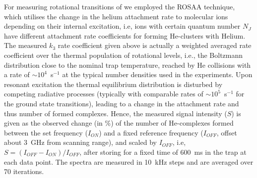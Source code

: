 For measuring rotational transitions of \co we employed the ROSAA technique, which utilises the change in the helium attachment rate to molecular ions depending on their internal excitation, i.e, ions with certain  quantum number $N_J$ have different attachment rate coefficients for forming He-\co clusters with Helium. The measured $k_3$ rate coefficient given above is actually a  weighted averaged rate coefficient over the thermal population of rotational levels, i.e., the Boltzmann distribution close to the nominal trap temperature, reached by He collisions with a rate of $\sim 10^4$~s$^{-1}$ at the typical number densities used in the experiments. Upon resonant excitation the thermal equilibrium distribution is disturbed by competing radiative processes (typically with comparable rates of $\sim 10^5$~s$^{-1}$ for the \co ground state transitions), leading to a change in the attachment rate and thus number of formed complexes. Hence, the measured signal intensity ($S$) is given as the observed change (in \%) of the number of He-\co complexes formed between the set frequency ($I_{ON}$) and a fixed reference frequency ($I_{OFF}$, offset about 3~GHz from scanning range), and scaled by $I_{OFF}$, i.e, $ S=(I_{OFF} - I_{ON})/I_{OFF} $, after storing for a fixed time of 600~ms in the trap at each data point. The spectra are measured in 10~kHz steps and are averaged over 70 iterations. \\

